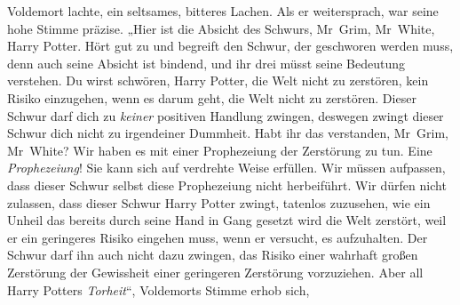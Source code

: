 Voldemort lachte, ein seltsames, bitteres Lachen. Als er weitersprach, war seine hohe Stimme präzise.
„Hier ist die Absicht des Schwurs, Mr~Grim, Mr~White, Harry Potter. Hört gut zu und begreift den Schwur, der geschworen werden muss, denn auch seine Absicht ist bindend, und ihr drei müsst seine Bedeutung verstehen. Du wirst schwören, Harry Potter, die Welt nicht zu zerstören, kein Risiko einzugehen, wenn es darum geht, die Welt nicht zu zerstören. Dieser Schwur darf dich zu \emph{keiner} positiven Handlung zwingen, deswegen zwingt dieser Schwur dich nicht zu irgendeiner Dummheit. Habt ihr das verstanden, Mr~Grim, Mr~White? Wir haben es mit einer Prophezeiung der Zerstörung zu tun. Eine \emph{Prophezeiung}! Sie kann sich auf verdrehte Weise erfüllen. Wir müssen aufpassen, dass dieser Schwur selbst diese Prophezeiung nicht herbeiführt. Wir dürfen nicht zulassen, dass dieser Schwur Harry Potter zwingt, tatenlos zuzusehen, wie ein Unheil das bereits durch seine Hand in Gang gesetzt wird die Welt zerstört, weil er ein geringeres Risiko eingehen muss, wenn er versucht, es aufzuhalten. Der Schwur darf ihn auch nicht dazu zwingen, das Risiko einer wahrhaft großen Zerstörung der Gewissheit einer geringeren Zerstörung vorzuziehen. Aber all Harry Potters \emph{Torheit}“,
Voldemorts Stimme erhob sich,
